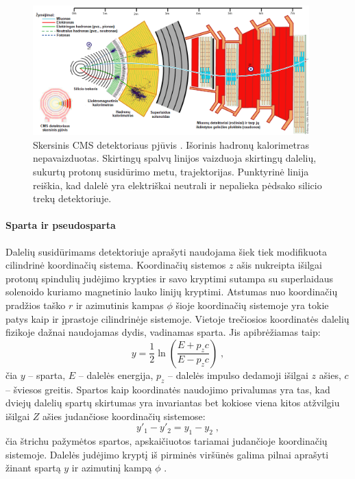 \documentclass[a4paper, 12pt]{article}
\newlength\q
\begin{document}
\begin{figure}[H] \centering
\includegraphics[width=0.95\textwidth]{CMSslice_LT.png}
\vspace{-0.1cm}
\caption{\label{fig:CMSslice}Skersinis CMS detektoriaus pjūvis \cite{CMSslice}. Išorinis hadronų kalorimetras nepavaizduotas. Skirtingų spalvų linijos vaizduoja skirtingų dalelių, sukurtų protonų susidūrimo metu, trajektorijas. Punktyrinė linija reiškia, kad dalelė yra elektriškai neutrali ir nepalieka pėdsako silicio trekų detektoriuje.}
\end{figure}

\paragraph{Sparta ir pseudosparta\\}

Dalelių susidūrimams detektoriuje aprašyti naudojama šiek tiek modifikuota cilindrinė koordinačių sistema. Koordinačių sistemos $z$ ašis nukreipta išilgai protonų spindulių judėjimo krypties ir savo kryptimi sutampa su superlaidaus solenoido kuriamo magnetinio lauko linijų kryptimi. Atstumas nuo koordinačių pradžios taško $r$ ir azimutinis kampas $\phi$ šioje koordinačių sistemoje yra tokie patys kaip ir įprastoje cilindrinėje sistemoje.
Vietoje trečiosios koordinatės dalelių fizikoje dažnai naudojamas dydis, vadinamas sparta. Jis apibrėžiamas taip:
\begin{equation}
y = \frac{1}{2} \ln{ \left( \frac{E+p_{z}c}{E-p_{z}c} \right) } \; \mathrm{,}
\label{eq:rapidity}
\end{equation}
čia $y$ -- sparta, $E$ -- dalelės energija, $p_{z}$ -- dalelės impulso dedamoji išilgai $z$ ašies, $c$ -- šviesos greitis. Spartos kaip koordinatės naudojimo privalumas yra tas, kad dviejų dalelių spartų skirtumas yra invariantas bet kokiose viena kitos atžvilgiu išilgai $Z$ ašies judančiose koordinačių sistemose:
\begin{equation}
y'_{1}-y'_{2}=y_{1}-y_{2}\; \mathrm{,}
\label{rapInvar}
\end{equation}
čia štrichu pažymėtos spartos, apskaičiuotos tariamai judančioje koordinačių sistemoje. Dalelės judėjimo kryptį iš pirminės viršūnės galima pilnai aprašyti žinant spartą $y$ ir azimutinį kampą $\phi$ \cite{pseudorapidity}.
\end{document}
